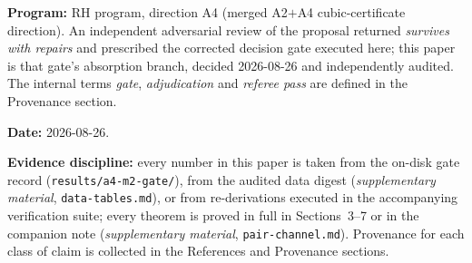 \documentclass[11pt]{article}
\theoremstyle{plain}
\theoremstyle{definition}
\theoremstyle{remark}
\begin{document}
\bigskip

\noindent\textbf{Program:} RH program, direction A4 (merged A2$+$A4
cubic-certificate direction). An independent adversarial review of the proposal
returned \emph{survives with repairs} and prescribed the corrected decision gate
executed here; this paper is that gate's absorption branch, decided 2026-08-26 and
independently audited. The internal terms \emph{gate}, \emph{adjudication} and
\emph{referee pass} are defined in the Provenance section.

\noindent\textbf{Date:} 2026-08-26.

\noindent\textbf{Evidence discipline:} every number in this paper is taken from
the on-disk gate record (\texttt{results/}\allowbreak\texttt{a4-m2-gate/}), from the audited data
digest (\emph{supplementary material}, \texttt{data-tables.md}), or from
re-derivations executed in the accompanying verification suite;
every theorem is proved in full in Sections~3--7 or in the companion note
(\emph{supplementary material}, \texttt{pair-channel.md}). Provenance for each
class of claim is collected in the References and Provenance sections.
\end{document}
